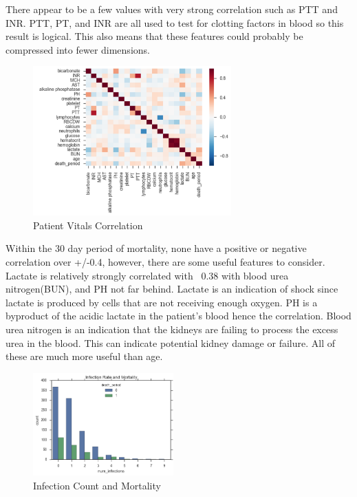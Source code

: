 \documentclass[11pt]{article}
\begin{document}
	
	There appear to be a few values with very strong correlation such as PTT and INR. PTT, PT, and INR are all used to test for clotting factors in blood so this result is logical. This also means that these features could probably be compressed into fewer dimensions.
	
	\begin{figure}
		\begin{center}
			\includegraphics[width=0.68\textwidth]{feature_correlation.png}
		\end{center}
		\caption{Patient Vitals Correlation}
	\end{figure}
	
	Within the 30 day period of mortality, none have a positive or negative correlation over +/-0.4, however, there are some useful features to consider. Lactate is relatively strongly correlated with ~0.38 with blood urea nitrogen(BUN), and PH not far behind. Lactate is an indication of shock since lactate is produced by cells that are not receiving enough oxygen. PH is a byproduct of the acidic lactate in the patient's blood hence the correlation. Blood urea nitrogen is an indication that the kidneys are failing to process the excess urea in the blood. This can indicate potential kidney damage or failure. All of these are much more useful than age.
	
	\begin{figure}
		\begin{center}
			\includegraphics[width=0.48\textwidth]{bio_graph.png}
		\end{center}
		\caption{Infection Count and Mortality}
	\end{figure}
	
\end{document}
